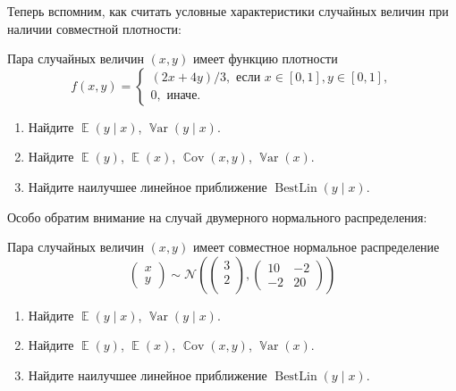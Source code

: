 \documentclass[12pt]{article}
\DeclareMathOperator{\Cov}{\mathbb{C}ov}
\DeclareMathOperator{\Var}{\mathbb{V}ar}
\DeclareMathOperator{\BestLin}{BestLin}
\DeclareMathOperator{\E}{\mathbb{E}}
\newcommand{\cN}{\mathcal{N}}
\begin{document}
Теперь вспомним, как считать условные характеристики случайных величин при наличии совместной плотности:
\begin{problem}
Пара случайных величин $(x, y)$ имеет функцию плотности
\[
f(x, y) = \begin{cases}
(2x + 4y)/3, \text{ если } x\in [0, 1], y\in [0, 1], \\
0, \text{ иначе.}
\end{cases}
\]

\begin{enumerate}
    \item Найдите $\E(y \mid x)$, $\Var(y \mid x)$.
    \item Найдите $\E(y)$, $\E(x)$, $\Cov(x, y)$, $\Var(x)$.
    \item Найдите наилучшее линейное приближение $\BestLin(y \mid x)$.
\end{enumerate}

    \begin{sol}
    \end{sol}
\end{problem}


Особо обратим внимание на случай двумерного нормального распределения:
\begin{problem}
Пара случайных величин $(x, y)$ имеет совместное нормальное распределение
\[
\begin{pmatrix}
    x \\
    y 
\end{pmatrix} \sim \cN\left(\begin{pmatrix}
    3 \\
    2 \\
\end{pmatrix}, 
\begin{pmatrix}
    10 & -2 \\
    -2 & 20
\end{pmatrix}\right)
\]

\begin{enumerate}
    \item Найдите $\E(y \mid x)$, $\Var(y \mid x)$.
    \item Найдите $\E(y)$, $\E(x)$, $\Cov(x, y)$, $\Var(x)$.
    \item Найдите наилучшее линейное приближение $\BestLin(y \mid x)$.
\end{enumerate}

    \begin{sol}
    \end{sol}
\end{problem}
\end{document}
